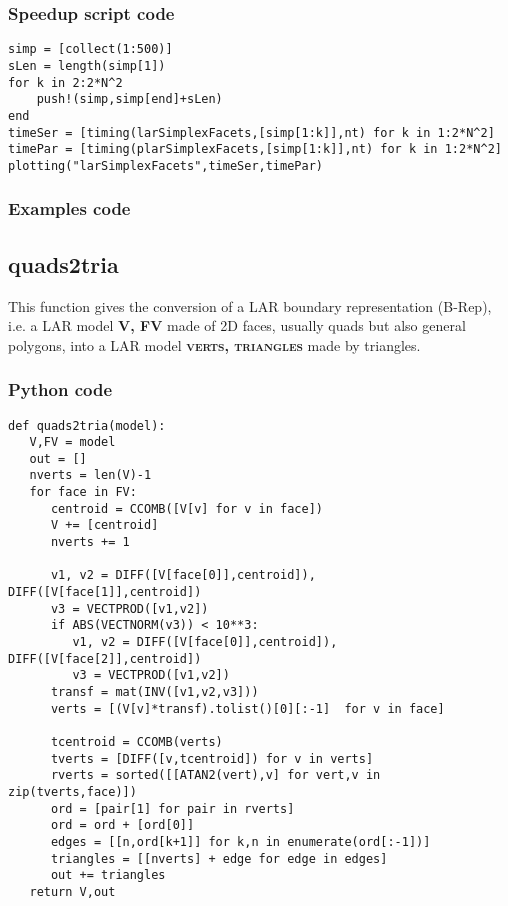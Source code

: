 \documentclass[a4paper,12pt,titlepage]{article}					%
\begin{document}
\subsubsection{Speedup script code}
\begin{Verbatim}
simp = [collect(1:500)]
sLen = length(simp[1])
for k in 2:2*N^2
	push!(simp,simp[end]+sLen)
end
timeSer = [timing(larSimplexFacets,[simp[1:k]],nt) for k in 1:2*N^2]
timePar = [timing(plarSimplexFacets,[simp[1:k]],nt) for k in 1:2*N^2]
plotting("larSimplexFacets",timeSer,timePar)
\end{Verbatim}

\subsubsection{Examples code}
\lipsum[6]


\subsection{quads2tria}
This function gives the conversion of a LAR boundary representation (B-Rep), i.e. a LAR model \textbf{\textsc{V, FV}} made of 2D faces, usually quads but also general polygons, into a LAR model \textbf{\textsc{verts, triangles}} made by triangles.

\subsubsection{Python code}
\begin{verbatim}
def quads2tria(model):
   V,FV = model
   out = []
   nverts = len(V)-1
   for face in FV:
      centroid = CCOMB([V[v] for v in face])
      V += [centroid]
      nverts += 1
      
      v1, v2 = DIFF([V[face[0]],centroid]), DIFF([V[face[1]],centroid])
      v3 = VECTPROD([v1,v2])
      if ABS(VECTNORM(v3)) < 10**3:
         v1, v2 = DIFF([V[face[0]],centroid]), DIFF([V[face[2]],centroid])
         v3 = VECTPROD([v1,v2])
      transf = mat(INV([v1,v2,v3]))
      verts = [(V[v]*transf).tolist()[0][:-1]  for v in face]

      tcentroid = CCOMB(verts)
      tverts = [DIFF([v,tcentroid]) for v in verts]
      rverts = sorted([[ATAN2(vert),v] for vert,v in zip(tverts,face)])
      ord = [pair[1] for pair in rverts]
      ord = ord + [ord[0]]
      edges = [[n,ord[k+1]] for k,n in enumerate(ord[:-1])]
      triangles = [[nverts] + edge for edge in edges]
      out += triangles
   return V,out
\end{verbatim}
\end{document}

